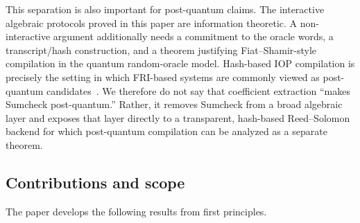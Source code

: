 This separation is also important for post-quantum claims.  The interactive algebraic protocols proved in this paper are information theoretic.  A non-interactive argument additionally needs a commitment to the oracle words, a transcript/hash construction, and a theorem justifying Fiat--Shamir-style compilation in the quantum random-oracle model.  Hash-based IOP compilation is precisely the setting in which FRI-based systems are commonly viewed as post-quantum candidates~\cite{WHIR24}.  We therefore do not say that coefficient extraction ``makes Sumcheck post-quantum.''  Rather, it removes Sumcheck from a broad algebraic layer and exposes that layer directly to a transparent, hash-based Reed--Solomon backend for which post-quantum compilation can be analyzed as a separate theorem.

\subsection{Contributions and scope}
\label{sec:intro-contributions}

The paper develops the following results from first principles.

